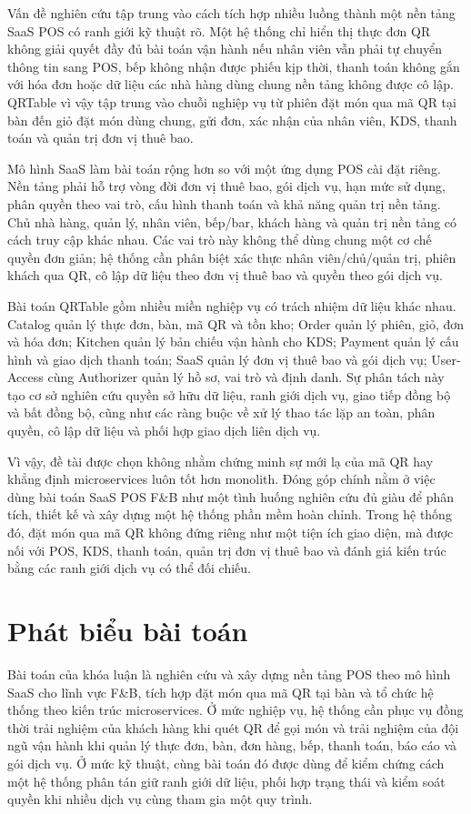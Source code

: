 Vấn đề nghiên cứu tập trung vào cách tích hợp nhiều luồng thành một nền tảng SaaS POS có ranh giới kỹ thuật rõ. Một hệ thống chỉ hiển thị thực đơn QR không giải quyết đầy đủ bài toán vận hành nếu nhân viên vẫn phải tự chuyển thông tin sang POS, bếp không nhận được phiếu kịp thời, thanh toán không gắn với hóa đơn hoặc dữ liệu các nhà hàng dùng chung nền tảng không được cô lập. QRTable vì vậy tập trung vào chuỗi nghiệp vụ từ phiên đặt món qua mã QR tại bàn đến giỏ đặt món dùng chung, gửi đơn, xác nhận của nhân viên, KDS, thanh toán và quản trị đơn vị thuê bao.

Mô hình SaaS làm bài toán rộng hơn so với một ứng dụng POS cài đặt riêng. Nền tảng phải hỗ trợ vòng đời đơn vị thuê bao, gói dịch vụ, hạn mức sử dụng, phân quyền theo vai trò, cấu hình thanh toán và khả năng quản trị nền tảng. Chủ nhà hàng, quản lý, nhân viên, bếp/bar, khách hàng và quản trị nền tảng có cách truy cập khác nhau. Các vai trò này không thể dùng chung một cơ chế quyền đơn giản; hệ thống cần phân biệt xác thực nhân viên/chủ/quản trị, phiên khách qua QR, cô lập dữ liệu theo đơn vị thuê bao và quyền theo gói dịch vụ.

Bài toán QRTable gồm nhiều miền nghiệp vụ có trách nhiệm dữ liệu khác nhau. Catalog quản lý thực đơn, bàn, mã QR và tồn kho; Order quản lý phiên, giỏ, đơn và hóa đơn; Kitchen quản lý bản chiếu vận hành cho KDS; Payment quản lý cấu hình và giao dịch thanh toán; SaaS quản lý đơn vị thuê bao và gói dịch vụ; User-Access cùng Authorizer quản lý hồ sơ, vai trò và định danh. Sự phân tách này tạo cơ sở nghiên cứu quyền sở hữu dữ liệu, ranh giới dịch vụ, giao tiếp đồng bộ và bất đồng bộ, cũng như các ràng buộc về xử lý thao tác lặp an toàn, phân quyền, cô lập dữ liệu và phối hợp giao dịch liên dịch vụ.

Vì vậy, đề tài được chọn không nhằm chứng minh sự mới lạ của mã QR hay khẳng định microservices luôn tốt hơn monolith. Đóng góp chính nằm ở việc dùng bài toán SaaS POS F\&B như một tình huống nghiên cứu đủ giàu để phân tích, thiết kế và xây dựng một hệ thống phần mềm hoàn chỉnh. Trong hệ thống đó, đặt món qua mã QR không đứng riêng như một tiện ích giao diện, mà được nối với POS, KDS, thanh toán, quản trị đơn vị thuê bao và đánh giá kiến trúc bằng các ranh giới dịch vụ có thể đối chiếu.

\section{Phát biểu bài toán}

Bài toán của khóa luận là nghiên cứu và xây dựng nền tảng POS theo mô hình SaaS cho lĩnh vực F\&B, tích hợp đặt món qua mã QR tại bàn và tổ chức hệ thống theo kiến trúc microservices. Ở mức nghiệp vụ, hệ thống cần phục vụ đồng thời trải nghiệm của khách hàng khi quét QR để gọi món và trải nghiệm của đội ngũ vận hành khi quản lý thực đơn, bàn, đơn hàng, bếp, thanh toán, báo cáo và gói dịch vụ. Ở mức kỹ thuật, cùng bài toán đó được dùng để kiểm chứng cách một hệ thống phân tán giữ ranh giới dữ liệu, phối hợp trạng thái và kiểm soát quyền khi nhiều dịch vụ cùng tham gia một quy trình.

